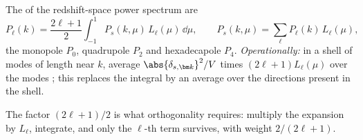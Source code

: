 \begin{workdef}
The  of the redshift-space power spectrum are
\[
  P_\ell(k)=\frac{2\ell+1}{2}\int_{-1}^{1}P_s(k,\mu)\,L_\ell(\mu)\,\dd\mu,
  \qquad
  P_s(k,\mu)=\sum_\ell P_\ell(k)\,L_\ell(\mu),
\]
the monopole $P_0$, quadrupole $P_2$ and hexadecapole $P_4$.
\emph{Operationally:} in a shell of modes of length near $k$, average
$\abs{\delta_{s,\bm k}}^2/V$ times $(2\ell+1)L_\ell(\mu)$ over the modes
; this replaces the integral by
an average over the directions present in the shell.
\end{workdef}
The factor $(2\ell+1)/2$ is what orthogonality requires: multiply the expansion by
$L_\ell$, integrate, and only the $\ell$-th term survives, with weight
$2/(2\ell+1)$.

